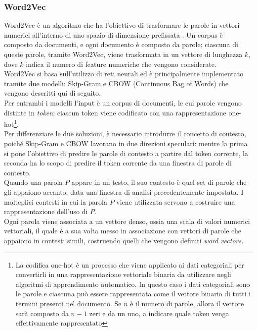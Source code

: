 \documentclass[12pt]{report}
\theoremstyle{definition}
\begin{document}
\subsubsection{Word2Vec} \label{w2v}
Word2Vec è un algoritmo che ha l'obiettivo di trasformare le parole in vettori numerici all'interno di uno spazio  di dimensione prefissata \cite{3}.
Un corpus è composto da documenti, e ogni documento è composto da parole; ciascuna di queste parole, tramite Word2Vec, viene trasformata in un vettore di lunghezza $k$, dove $k$ indica il numero di feature numeriche che vengono considerate. 
\\
Word2Vec si basa sull'utilizzo di reti neurali \cite{3} ed è principalmente implementato tramite due modelli: Skip-Gram e CBOW (Continuous Bag of Words) che vengono descritti qui di seguito.
\\
Per entrambi i modelli l'input è un corpus di documenti, le cui parole vengono distinte in \textit{token}; ciascun token viene codificato con una rappresentazione one-hot\footnote{La codifica one-hot è un processo che viene applicato ai dati categoriali per convertirli in una rappresentazione vettoriale binaria da utilizzare negli algoritmi di apprendimento automatico. In questo caso i dati categoriali sono le parole e ciascuna può essere rappresentata come il vettore binario di tutti i termini presenti nel documento. Se $n$ è il numero di parole, allora il vettore sarà composto da $n-1$ zeri e da un uno, a indicare quale token venga effettivamente rappresentato}.
\\
Per differenziare le due soluzioni, è necessario introdurre il concetto di contesto, poiché Skip-Gram e CBOW lavorano in due direzioni speculari:
mentre la prima si pone l'obiettivo di predire le parole di contesto a partire dal token corrente, la seconda ha lo scopo di predire il token corrente da una finestra di parole di contesto.
\\
Quando una parola $P$ appare in un testo, il suo contesto è quel set di parole che gli appaiono accanto, data una finestra di analisi precedentemente impostata. I molteplici contesti in cui la parola $P$ viene utilizzata servono a costruire una rappresentazione dell’uso di $P$.
\\
Ogni parola viene associata a un vettore denso, ossia una scala di valori numerici vettoriali, il quale è a sua volta messo in associazione con vettori di parole che appaiono in contesti simili, costruendo quelli che vengono definiti \textit{word vectors}.
\end{document}
